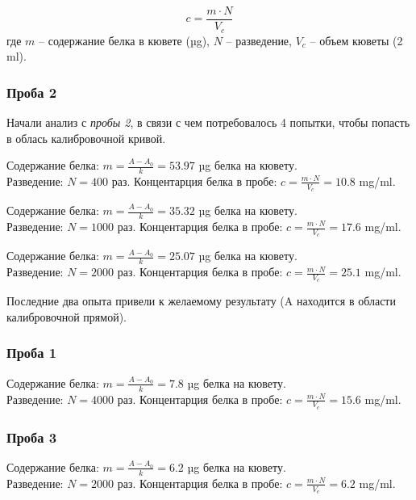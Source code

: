 $$ c = \frac{m \cdot N}{V_c} $$
где $m$ -- содержание белка в кювете (µg),
$N$ -- разведение,
$V_c$ -- объем кюветы (2 ml).

\subsubsection{Проба 2}
Начали анализ с \emph{пробы 2}, в связи с чем потребовалось 4 попытки,
чтобы попасть в облась калибровочной кривой.

\def\svgwidth{\linewidth}

\def\svgwidth{\linewidth}
Содержание белка: $ m = \frac{A-A_0}{k} = 53.97 $ µg белка на кювету. \\
Разведение: $ N = 400 $ раз.
Концентарция белка в пробе: $ c = \frac{m \cdot N}{V_c} = 10.8 $ mg/ml.

\def\svgwidth{\linewidth}
Содержание белка: $ m = \frac{A-A_0}{k} = 35.32 $ µg белка на кювету. \\
Разведение: $ N = 1000 $ раз.
Концентарция белка в пробе: $ c = \frac{m \cdot N}{V_c} = 17.6 $ mg/ml.

\def\svgwidth{\linewidth}
Содержание белка: $ m = \frac{A-A_0}{k} = 25.07 $ µg белка на кювету. \\
Разведение: $ N = 2000 $ раз.
Концентарция белка в пробе: $ c = \frac{m \cdot N}{V_c} = 25.1 $ mg/ml.

Последние два опыта привели к желаемому результату
(A находится в области калибровочной прямой).

\subsubsection{Проба 1}
\def\svgwidth{\linewidth}
Содержание белка: $ m = \frac{A-A_0}{k} = 7.8 $ µg белка на кювету. \\
Разведение: $ N = 4000 $ раз.
Концентарция белка в пробе: $ c = \frac{m \cdot N}{V_c} = 15.6 $ mg/ml.

\subsubsection{Проба 3}
\def\svgwidth{\linewidth}
Содержание белка: $ m = \frac{A-A_0}{k} = 6.2 $ µg белка на кювету. \\
Разведение: $ N = 2000 $ раз.
Концентарция белка в пробе: $ c = \frac{m \cdot N}{V_c} = 6.2 $ mg/ml.


